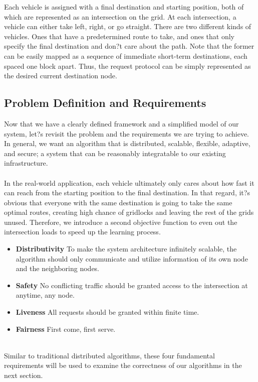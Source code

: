 \documentclass[conference]{IEEEtran}
\begin{document}
Each vehicle is assigned with a final destination and starting position, both of which are represented as an intersection on the grid. At each intersection, a vehicle can either take left, right, or go straight. There are two different kinds of vehicles. Ones that have a predetermined route to take, and ones that only specify the final destination and don?t care about the path. Note that the former can be easily mapped as a sequence of immediate short-term destinations, each spaced one block apart. Thus, the request protocol can be simply represented as the desired current destination node.

\subsection{Problem Definition and Requirements}
Now that we have a clearly defined framework and a simplified model of our system, let?s revisit the problem and the requirements we are trying to achieve. In general, we want an algorithm that is distributed, scalable, flexible, adaptive, and secure; a system that can be reasonably integratable to our existing infrastructure. \\

\\

In the real-world application, each vehicle ultimately only cares about how fast it can reach from the starting position to the final destination. In that regard, it?s obvious that everyone with the same destination is going to take the same optimal routes, creating high chance of gridlocks and leaving the rest of the grids unused. Therefore, we introduce a second objective function to even out the intersection loads to speed up the learning process.\\

\begin{itemize}
\item {\bf Distributivity} To make the system architecture infinitely scalable, the algorithm should only communicate and utilize information of its own node and the neighboring nodes.
\item {\bf Safety} No conflicting traffic should be granted access to the intersection at anytime, any node.
\item {\bf Liveness} All requests should be granted within finite time.
\item {\bf Fairness} First come, first serve.
\end{itemize}
\-\\
Similar to traditional distributed algorithms, these four fundamental requirements will be used to examine the correctness of our algorithms in the next section.
\end{document}
